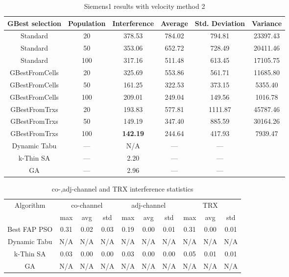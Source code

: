 \begin{table}[H]
\centering
	\begin{tabular}{cccccc}
	\toprule
    GBest selection & Population & Interference & Average & Std. Deviation & Variance \\
    \midrule
    Standard & 20 & 378.53 & 784.02 & 794.81 & 23397.43\\
    Standard & 50 & 353.06 & 652.72 & 728.49 & 20411.46\\
    Standard & 100 & 317.16 & 511.48 & 613.45 & 17105.75\\
    GBestFromCells & 20 & 325.69 & 553.86 & 561.71 & 11685.80\\
    GBestFromCells & 50 & 161.25 & 322.53 & 373.15 & 5355.40\\
    GBestFromCells & 100 & 209.01 & 249.04 & 149.56 & 1016.78\\
    GBestFromTrxs & 20 & 193.83 & 577.81 & 1111.87 & 45787.46\\
    GBestFromTrxs & 50 & 149.19 & 347.40 & 885.59 & 30164.26\\
    GBestFromTrxs & 100 & \textbf{142.19} & 244.64 & 417.93 & 7939.47\\
    \midrule
    Dynamic Tabu & --- & \small{N/A} & --- & --- \\
    k-Thin SA & --- & 2.20 & --- & --- \\
    GA & --- & 2.96 & --- & --- \\
    \bottomrule
	\end{tabular}
\caption{Siemens1 results with velocity method 2}
\label{tab:siem1m2}
\end{table}
\begin{table}[H]
\centering
	\begin{tabular}{cccccccccc}
	\toprule
    Algorithm & \multicolumn{3}{c}{co-channel} & \multicolumn{3}{c}{adj-channel} & \multicolumn{3}{c}{TRX}\\
              & max & avg & std
              & max & avg & std
              & max & avg & std\\
    \midrule
    Best FAP PSO & 0.31 & 0.02 & 0.03 & 0.19 & 0.00 & 0.01 & 0.31 & 0.00 & 0.01\\ 
    Dynamic Tabu & \scriptsize{N/A} & \scriptsize{N/A} & \scriptsize{N/A} & \scriptsize{N/A} & \scriptsize{N/A} & \scriptsize{N/A} & \scriptsize{N/A} & \scriptsize{N/A} & \scriptsize{N/A}\\
    k-Thin SA & 0.03 & 0.00 & 0.00 & 0.03 & 0.00 & 0.00 & 0.05 & 0.01 & 0.01\\
    GA & \scriptsize{N/A} & \scriptsize{N/A} &  \scriptsize{N/A} &  \scriptsize{N/A} &  \scriptsize{N/A} &  \scriptsize{N/A} &  \scriptsize{N/A} &  \scriptsize{N/A} & \scriptsize{N/A}\\
    \bottomrule
	\end{tabular}
\caption{co-,adj-channel and TRX interference statistics}
\label{tab:stats-siem1m1}
\end{table}
